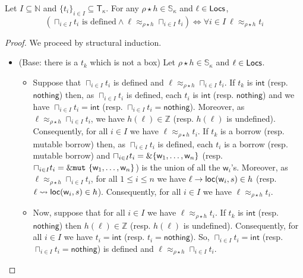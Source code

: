 \begin{lemma}\label{lem:co-additive-type}
  Let $I\subseteq\mathbb{N}$ and $\{t_i\}_{i\in I}\subseteq\mathsf{T}_\kappa$.
  For any $\rho\star h\in\mathbb{S}_\kappa$ and $\ell\in\mathsf{Locs}$,
  \[(\sqcap_{i\in I}t_i \text{ is defined} \land
  \ell\approx_{\rho\star h}\sqcap_{i\in I}t_i)
  \iff \forall i\in I\ \ell\approx_{\rho\star h}t_i\]
\end{lemma}
\begin{proof}
  We proceed by structural induction.
  \begin{itemize}
    \item (Base: there is a $t_k$ which is not a box)
    Let $\rho\star h\in\mathbb{S}_\kappa$ and $\ell\in\mathsf{Locs}$.
    \begin{itemize}
      \item Suppose that $\sqcap_{i\in I}t_i$ is defined and
      $\ell\approx_{\rho\star h}\sqcap_{i\in I}t_i$.
      If $t_k$ is $\mathsf{int}$ (resp. $\mathsf{nothing}$) then,
      as $\sqcap_{i\in I}t_i$ is defined, each $t_i$ is $\mathsf{int}$
      (resp. $\mathsf{nothing}$) and we have $\sqcap_{i\in I}t_i=\mathsf{int}$
      (resp. $\sqcap_{i\in I}t_i=\mathsf{nothing}$).
      Moreover, as $\ell\approx_{\rho\star h}\sqcap_{i\in I}t_i$, we have
      $h(\ell)\in\mathbb{Z}$ (resp. $h(\ell)$ is undefined). Consequently,
      for all $i\in I$ we have $\ell\approx_{\rho\star h}t_i$.
      If $t_k$ is a borrow (resp. mutable borrow) then, as $\sqcap_{i\in I}t_i$
      is defined, each $t_i$ is a borrow (resp. mutable borrow) and
      $\sqcap_{i\in I}t_i=\&\{\mathsf{w}_1,\ldots,\mathsf{w}_n\}$
      (resp. $\sqcap_{i\in I}t_i=\&\mathtt{mut}\ \{\mathsf{w}_1,\ldots,\mathsf{w}_n\}$)
      is the union of all the $\mathsf{w}_i$'s. Moreover, as
      $\ell\approx_{\rho\star h}\sqcap_{i\in I}t_i$, for all $1\le i\le n$
      we have $\ell\to\mathsf{loc}(\mathsf{w}_i,s)\in h$
      (resp. $\ell\leadsto\mathsf{loc}(\mathsf{w}_i,s)\in h$). Consequently,
      for all $i\in I$ we have $\ell\approx_{\rho\star h}t_i$.
      \item Now, suppose that for all $i\in I$ we have $\ell\approx_{\rho\star h}t_i$.
      If $t_k$ is $\mathsf{int}$ (resp. $\mathsf{nothing}$) then
      $h(\ell)\in\mathbb{Z}$ (resp. $h(\ell)$ is undefined). Consequently,
      for all $i\in I$ we have $t_i = \mathsf{int}$ (resp. $t_i = \mathsf{nothing}$).
      So, $\sqcap_{i\in I}t_i = \mathsf{int}$
      (resp. $\sqcap_{i\in I}t_i=\mathsf{nothing}$) is defined and
      $\ell\approx_{\rho\star h}\sqcap_{i\in I}t_i$.

\end{itemize}
\end{itemize}
\end{proof}
